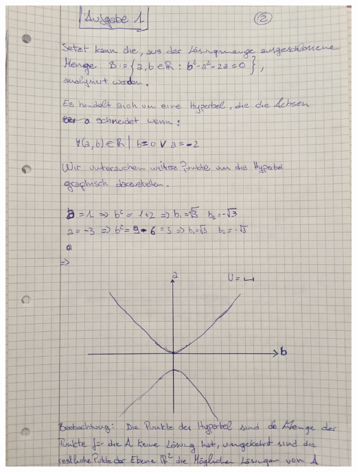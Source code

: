 \documentclass[10pt,a4paper]{article}
\begin{document}
\includegraphics[scale=0.2, angle=270]{A1_2.jpg} 
\end{document}
